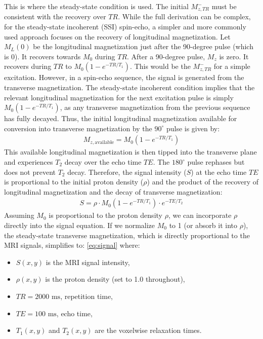 \documentclass[10pt,a4paper,twoside]{article}
\begin{document}
This is where the steady-state condition is used. The initial $M_{z,TR}^-$ must be consistent with the recovery over $TR$.
While the full derivation can be complex, for the steady-state incoherent (SSI) spin-echo, a simpler and more commonly used approach focuses on the recovery of longitudinal magnetization.
Let $M_L(0)$ be the longitudinal magnetization just after the 90-degree pulse (which is 0). It recovers towards $M_0$ during $TR$.
After a 90-degree pulse, $M_z$ is zero. It recovers during $TR$ to $M_0(1-e^{-TR/T_1})$. This would be the $M_{z,TR}^-$ for a simple excitation.
However, in a spin-echo sequence, the signal is generated from the transverse magnetization. The steady-state incoherent condition implies that the relevant longitudinal magnetization for the next excitation pulse is simply $M_0(1-e^{-TR/T_1})$, as any transverse magnetization from the previous sequence has fully decayed.
Thus, the initial longitudinal magnetization available for conversion into transverse magnetization by the $90^\circ$ pulse is given by:
\begin{gather*}
M_{z,\text{available}} = M_0(1-e^{-TR/T_1})
\end{gather*}
This available longitudinal magnetization is then tipped into the transverse plane and experiences $T_2$ decay over the echo time $TE$. The $180^\circ$ pulse rephases but does not prevent $T_2$ decay.
Therefore, the signal intensity ($S$) at the echo time $TE$ is proportional to the initial proton density ($\rho$) and the product of the recovery of longitudinal magnetization and the decay of transverse magnetization:
\begin{gather*}
S = \rho \cdot M_0(1-e^{-TR/T_1}) \cdot e^{-TE/T_2}
\end{gather*}
Assuming $M_0$ is proportional to the proton density $\rho$, we can incorporate $\rho$ directly into the signal equation. If we normalize $M_0$ to 1 (or absorb it into $\rho$), the steady-state transverse magnetization, which is directly proportional to the MRI signals, simplifies to:
    \eqref{eq:signal}
where:
\begin{itemize}
    \item \(S(x, y)\) is the MRI signal intensity,
    \item \(\rho(x, y)\) is the proton density (set to 1.0 throughout),
    \item \(TR = 2000 \text{ ms}\), repetition time,
    \item \(TE = 100 \text{ ms}\), echo time,
    \item \(T_1(x, y)\) and \(T_2(x, y)\) are the voxelwise relaxation times.
\end{itemize}
\end{document}
